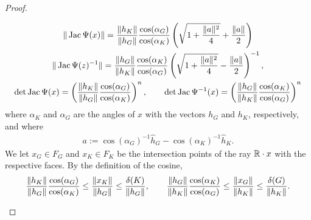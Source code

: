 \documentclass[10pt,letterpaper]{article}
\begin{document}
\begin{proof}
\begin{itemize}
        \begin{gather*}
            \| \operatorname{{\rm Jac}}\Psi(x) \|
            = 
            \frac{ \| h_K \| }{ \| h_{{G}} \| }
            \frac{ \cos(\alpha_{{G}}) }{ \cos(\alpha_K) }
            \left( 
                \sqrt{ 1 + \frac{ \|a\|^{2} }{ 4 } } + \frac{ \|a\| }{2}
            \right)
            \\
            \| \operatorname{{\rm Jac}}\Psi(z)^{-1} \|
            = 
            \frac{ \| h_{{G}} \| }{ \| h_K \| }
            \frac{ \cos(\alpha_K) }{ \cos(\alpha_{{G}}) }
            \left( 
                \sqrt{ 1 + \frac{ \|a\|^{2} }{ 4 } } - \frac{ \|a\| }{2}
            \right)^{-1},
            \\
            \det\operatorname{{\rm Jac}}\Psi(x)
            =
            \left( 
            \frac{ \| h_K \| }{ \| h_{{G}} \| }
            \frac{ \cos(\alpha_{{G}}) }{ \cos(\alpha_K) }
            \right)^{n},
            \qquad
            \det\operatorname{{\rm Jac}}\Psi^{-1}(x)
            =
            \left( 
            \frac{ \| h_{{G}} \| }{ \| h_{K} \| }
            \frac{ \cos(\alpha_{K}) }{ \cos(\alpha_{{G}}) }
            \right)^{n}
        \end{gather*}
        where $\alpha_K$ and $\alpha_{{G}}$ are the angles of $x$ with the vectors $h_{{G}}$ and $h_{K}$, respectively,
        and where 
        \begin{align*}
            a := \cos(\alpha_{{G}})^{-1} \hat h_{{G}} - \cos(\alpha_K)^{-1} \hat h_K
            .
        \end{align*}
        We let $x_{G} \in F_{G}$ and $x_{K} \in F_{K}$ be the intersection points of the ray ${\mathbb R} \cdot x$ with the respective faces.
        By the definition of the cosine, 
        \begin{align*}
            \frac{ \| h_K \| }{ \| h_{{G}} \| }
            \frac{ \cos(\alpha_{{G}}) }{ \cos(\alpha_K) }
            \leq 
            \frac{ \| x_K \| }{ \| h_{{G}} \| }
            \leq 
            \frac{ {\delta}(K) }{ \| h_{{G}} \| }
            ,
            \qquad 
            \frac{ \| h_{{G}} \| }{ \| h_K \| }
            \frac{ \cos(\alpha_K) }{ \cos(\alpha_{{G}}) }
            \leq 
            \frac{ \| x_{G} \| }{ \| h_{K} \| }
            \leq 
            \frac{ {\delta}(G) }{ \| h_{K} \| }
            .
        \end{align*}


\end{itemize}
\end{proof}
\end{document}
